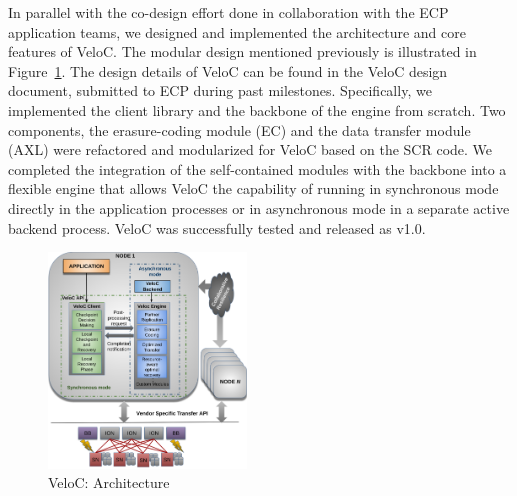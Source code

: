 In parallel with the co-design effort done in collaboration with the
ECP application teams, we designed and implemented the architecture and
core features of VeloC. The modular design mentioned previously is
illustrated in Figure~\ref{fig:veloc:arch}. The design details of
VeloC can be found in the VeloC design document, submitted to ECP
during past milestones. Specifically, we implemented the client
library and the backbone of the engine from scratch. Two components,
the erasure-coding module (EC) and the data transfer module (AXL) were
refactored and modularized for VeloC based on the SCR code. We
completed the integration of the self-contained modules with the
backbone into a flexible engine that allows VeloC the capability of
running in synchronous mode directly in the application processes or
in asynchronous mode in a separate active backend process. VeloC was
successfully tested and released as v1.0.

\begin{figure}
  \includegraphics[width=0.47\textwidth]{projects/2.3.4-DataViz/2.3.4.14-VeloC-SZ/veloc-arch}
  \caption{VeloC: Architecture}%
  \label{fig:veloc:arch}%
\end{figure}


